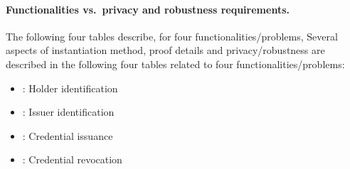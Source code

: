
\newcommand{\begminB}[1]{\begmin{#1}\setlist[itemize]{leftmargin=1.5ex}\renewcommand{\labelitemi}{-}}

\newenvironment{funcprivtabular}[3]{\begin{center}%
		\renewcommand{\thelinenumber}{}\footnotesize
		\begin{edtable}{tabular}{%
			|>{\begminB{#1}}l<{\myendmini}|%
			>{\begminB{#2}}l<{\myendmini}|%
			>{\begminB{#3}}l|}
		}{\end{edtable}\vspace{1em}\end{center}}



\paragraph{Functionalities vs.\ privacy and robustness requirements.}



	The following four tables describe, for four functionalities/problems, 
	Several aspects of instantiation method, proof details and privacy/robustness are described in the 
following four tables related to four functionalities/problems:
\begin{itemize}
\item {}: Holder identification
\item {}: Issuer identification
\item {}: Credential issuance
\item {}: Credential revocation
\end{itemize}



